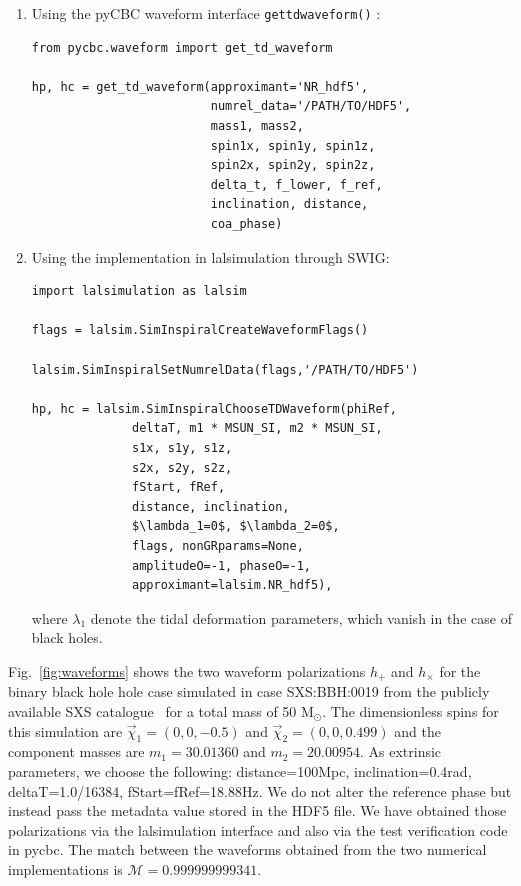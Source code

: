 \documentclass[aps,prd,amssymb,amsmath,amsfonts,superscriptaddress,
floatfix ,preprintnumbers,altaffilletter]{revtex4}
\begin{document}
\begin{enumerate}
  \item Using the pyCBC waveform interface \texttt{get\textunderscore td\textunderscore waveform()} :\\
\begin{lstlisting}
from pycbc.waveform import get_td_waveform 

hp, hc = get_td_waveform(approximant='NR_hdf5', 
                         numrel_data='/PATH/TO/HDF5',
                         mass1, mass2,
                         spin1x, spin1y, spin1z,
                         spin2x, spin2y, spin2z, 
                         delta_t, f_lower, f_ref,
                         inclination, distance, 
                         coa_phase)
\end{lstlisting}

\item Using the implementation in lalsimulation through SWIG:\\
\begin{lstlisting}[mathescape=true]
import lalsimulation as lalsim

flags = lalsim.SimInspiralCreateWaveformFlags()

lalsim.SimInspiralSetNumrelData(flags,'/PATH/TO/HDF5')

hp, hc = lalsim.SimInspiralChooseTDWaveform(phiRef, 
              deltaT, m1 * MSUN_SI, m2 * MSUN_SI, 
              s1x, s1y, s1z,
              s2x, s2y, s2z, 
              fStart, fRef, 
              distance, inclination,
              $\lambda_1=0$, $\lambda_2=0$, 
              flags, nonGRparams=None, 
              amplitudeO=-1, phaseO=-1, 
              approximant=lalsim.NR_hdf5),
\end{lstlisting}
where $\lambda_1$ denote the tidal deformation parameters, which vanish in the case of black holes. 
\end{enumerate}
Fig.~\ref{fig:waveforms} shows the two waveform polarizations $h_+$ and $h_{\times}$ for the binary black hole hole case simulated in case 
SXS:BBH:0019 from the publicly available SXS catalogue~\cite{Mroue:2013xna} for a total mass of 50 $\mathrm{M}_\odot$. The dimensionless spins for this simulation are
$\vec{\chi}_1=(0,0,-0.5)$ and $\vec{\chi}_2=(0,0,0.499)$ and the component masses are $m_1=30.01360$ and $m_2=20.00954$.
As extrinsic parameters, we choose the following: distance=100Mpc, inclination=0.4rad, deltaT=1.0/16384, fStart=fRef=18.88Hz. We do not alter
the reference phase but instead pass the metadata value stored in the HDF5 file. We have obtained those polarizations via the lalsimulation interface and also via the test verification code in pycbc. The match between the waveforms obtained from the two numerical implementations is $\mathcal{M}=0.999999999341$.
\end{document}
